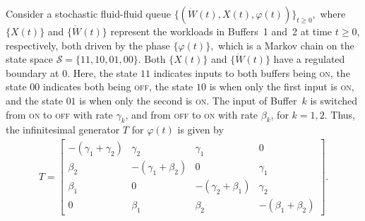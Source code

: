 \begin{model}\label{model: ffq}
	Consider a stochastic fluid-fluid queue $\{(\dot W(t),X(t),\varphi(t))\}_{t\geq0},$ where $\{X(t)\}$ and $\{\dot W(t)\}$ represent the workloads in Buffers~1 and~2 at time $t \geq 0$, respectively, both driven by the phase $\{\varphi(t)\},$ which is a Markov chain on the state space $\mathcal{S} = \{11,10,01,00\}$. Both $\{X(t)\}$ and $\{\dot W(t)\}$ have a regulated boundary at 0. Here, the state $11$ indicates inputs to both buffers being \textnormal{\textsc{on}}, the state $00$ indicates both being \textnormal{\textsc{off}}, the state $10$ is when only the first input is \textnormal{\textsc{on}}, and the state $01$ is when only the second is \textnormal{\textsc{on}}. The input of Buffer~$k$ is switched from \textnormal{\textsc{on}} to \textnormal{\textsc{off}} with rate $\gamma_k$, and from \textnormal{\textsc{off}} to \textnormal{\textsc{on}} with rate $\beta_k$, for $k = 1, 2$. Thus, the infinitesimal generator $T$ for $\varphi(t)$ is given by 
	\begin{align*} 
		T = \left[ \begin{array}{cccc} -(\gamma_1 + \gamma_2) & \gamma_2 & \gamma_1 & 0 \\
							\beta_2 & -(\gamma_1 + \beta_2) & 0 & \gamma_1 \\
							\beta_1 & 0 & -(\gamma_2 + \beta_1) & \gamma_2 \\
							0 & \beta_1 &\beta_2 &-(\beta_1 + \beta_2)
	\end{array}\right].
	\end{align*} 


\end{model}
